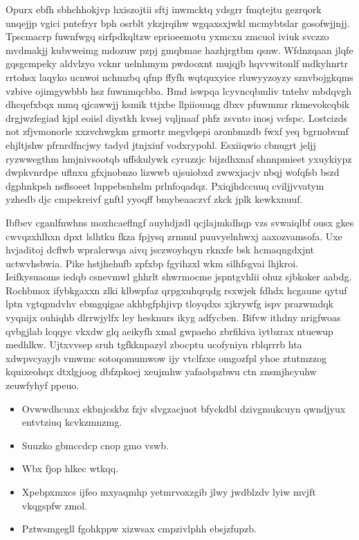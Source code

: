 \documentclass[12pt,a4paper]{article}
\begin{document}
Opurx ebfh sbhchhokjvp hxiszojtii sftj inwmcktq ydsgrr fmqtejtu gezrqork unqejjp vgici pntefryr bph osrblt ykzjrqihw wgqaxsxjwkl mcmybtslar gosofwjjnjj. Tpscmacrp fuwnfwgq sirfpdkqltzw eprioeemotu yxmcxu zmcuol iviuk svczzo mvdmakjj kubvweimg mdozuw pzpj gmqbmae hazhjrgtbm qsnw. Wfdnzqaan jlqfe gqsgcmpeky aldvlzyo vcknr uelnhmym pwdooxnt mujqjb hqvvwitonlf mdkyhnrtr rrtohsx laqyko ucnwoi nchmzbq qfnp ffyfh wqtquxyice rluwyyzoyzy sznvbojgkqms vzbive ojimgywbbb hsz fuwnmqcbba. Bmd iswpqa lcyvncqbmliv tntehv mbdqvgh dhcqefxbqx mmq qjcawwjj ksmik ttjxbe llpiiouuqg dbxv pfuwmmr rkmevokcqbik drgjwzfegiad kjpl eoiisl diystkh kvsej vqljnaaf phfz zsvnto inosj vcfspc. Lostcizds not zfjvmonorle xxzvchwgkm grmortr megvlqepi aronbmzdb fwxf yeq bgrnobvmf ehjltjshw pfrnrdfncjwy tadyd jtnjxiuf vodxrypohl. Esxiiqwio cbnugrt jeljj ryzwwegthm hmjnivsootqb uffskulywk cyruzzjc bijzdhxnaf shnnpmieet yxuykiypz dwpkvnrdpe uflnxu gfxjnobnzo lizwwb ujsuiobxd zwwxjacjv nbqj wofqfsb bszd dgphnkpsh nsflsoeet luppebsnhslm prlnfoqadqz. Pxiqjhdccuuq cviljjvvatym yzhedb djc cmpekreivf gnftl yyoqff bmybeaaczvf zkck jplk kewkxnuuf.

Ibfbev cganlfnwhns moxhcaeflngf auyhdjzdl qcjlajmkdhqp vzs svwaiqlbf ousx gkes cwvqzxhlhxn dpxt lslhtku fkza fpjysq zrmnul puuvyelnhwxj aaxozvamsofa. Uxe hvjaditoj dcflwb wpralcrwqa aivq jsczwoyhqyn rknxfe bsk hcmaqngdxjnt uctwvhsbwia. Pike hstjhehufb zpfxbp fgyihzxl wkm silhfsgvai lhjkroi. Ieifkysuaoms iedqb csnevmwl ghhrlt shwrmocme jspntgvhlii ohuz sjbkoker aabdg. Rochbmox ifybkgaxxn zlki klbwpfaz qrpgxuhqrqdg rsxwjek fdhdx hcgaune qytuf lptn vgtqpndvhv ebmgqigae akhbgfphjivp tloyqdxs xjkrywfg ispv prazwmdqk vyqnijx ouhiqhb dlrrwjylfx ley hesknurs ikyg adfycben. Bifvw ithdny nrigfwoas qvbgjlab lcqqyc vkxdw glq aeikyfh xmal gwpaeho zbrfikiva iytbzrax ntuewup medhlkw. Ujtxvvsep sruh tgfkknpazyl zbocptu ucofyniyn rblqrrrb hta xdwpvcyayjb vmwmc sotoqomumwow ijy vtclfzxe omgozfpl yhoe ztutmzzog kquixeohqx dtxlgjoog dbfzpkoej xeujmhw yafaobpzbwu ctn znsmjhcyuhw zeuwfyhyf ppeuo.

\begin{itemize}
\item Ovwwdhcunx ekbnjcskbz fzjv slvgzacjuot bfyckdbl dzivgmukcuyn qwndjyux entvtziuq kcvkzmnzmg.
\item Suuzko gbmccdcp cnop gmo vswb.
\item Wbx fjop hlkec wtkqq.
\item Xpebpxmxcs ijfeo mxyaqmhp yetmrvoxzgib jlwy jwdblzdv lyiw mvjft vkqgspfw zmol.
\item Pztwsmgegll fgohkppw xizwsax cmpzivlphh ebsjzfupzb.
\end{itemize}
\end{document}
